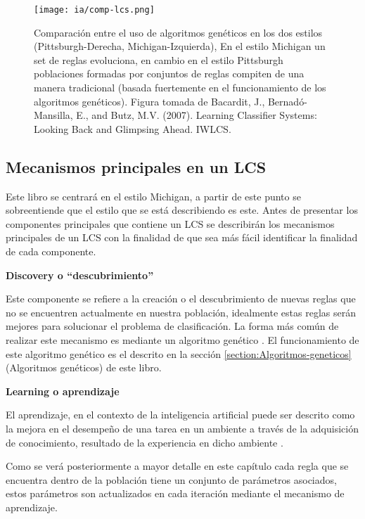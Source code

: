 \documentclass[11pt,fleqn]{book} %
\begin{document}
\begin{figure}[ht]
\centering\texttt{[image: ia/comp-lcs.png]}
\caption{Comparación entre el uso de algoritmos genéticos en los dos estilos (Pittsburgh-Derecha, Michigan-Izquierda), En el estilo Michigan un set de reglas evoluciona, en cambio en el estilo Pittsburgh poblaciones formadas por conjuntos de reglas compiten de una manera tradicional (basada fuertemente en el funcionamiento de los algoritmos genéticos). Figura tomada de Bacardit, J., Bernadó-Mansilla, E., and Butz, M.V. (2007). Learning Classifier Systems: Looking Back and Glimpsing Ahead. IWLCS. \cite{LCS_LBGA}}
\label{fig:comp-lcs} 
\end{figure}

\subsection{Mecanismos principales en un LCS} 

Este libro se centrará en el estilo Michigan, a partir de este punto se sobreentiende que el estilo que se está describiendo es este. Antes de presentar los componentes principales que contiene un LCS se describirán los mecanismos principales de un LCS con la finalidad de que sea más fácil identificar la finalidad de cada componente.

\clearpage
\textbf{Discovery o “descubrimiento”}

Este componente se refiere a la creación o el descubrimiento de nuevas reglas que no se encuentren actualmente en nuestra población, idealmente estas reglas serán mejores para solucionar el problema de clasificación. La forma más común de realizar este mecanismo es mediante un algoritmo genético \cite{UrbanowiczLCS}. El funcionamiento de este algoritmo genético es el descrito en la sección \ref{section:Algoritmos-geneticos}(Algoritmos genéticos) de este libro.

\textbf{Learning o aprendizaje}

El aprendizaje, en el contexto de la inteligencia artificial puede ser descrito como la mejora en el desempeño de una tarea en un ambiente a través de la adquisición de conocimiento, resultado de la experiencia en dicho ambiente \cite{rug01_000857792}. 

Como se verá posteriormente a mayor detalle en este capítulo cada regla que se encuentra dentro de la población tiene un conjunto de parámetros asociados, estos parámetros son actualizados en cada iteración mediante el mecanismo de aprendizaje.
\end{document}
